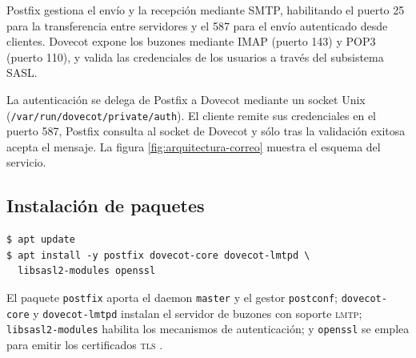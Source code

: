 Postfix gestiona el env\'io y la recepci\'on mediante SMTP, habilitando el
puerto 25 para la transferencia entre servidores y el 587 para el env\'io
autenticado desde clientes. Dovecot expone los buzones mediante IMAP
(puerto 143) y POP3 (puerto 110), y valida las credenciales de los usuarios
a trav\'es del subsistema SASL.

La autenticaci\'on se delega de Postfix a Dovecot mediante un socket Unix
(\texttt{/var/run/dovecot/private/auth}). El cliente remite sus
credenciales en el puerto 587, Postfix consulta al socket de Dovecot y s\'olo
tras la validaci\'on exitosa acepta el mensaje. La figura
\ref{fig:arquitectura-correo} muestra el esquema del servicio.


\subsection{Instalaci\'on de paquetes}

\begin{lstlisting}[style=terminal]
$ apt update
$ apt install -y postfix dovecot-core dovecot-lmtpd \
  libsasl2-modules openssl
\end{lstlisting}

El paquete \texttt{postfix} aporta el daemon \texttt{master} y el gestor
\texttt{postconf}; \texttt{dovecot-core} y \texttt{dovecot-lmtpd} instalan el
servidor de buzones con soporte \textsc{lmtp}; \texttt{libsasl2-modules}
habilita los mecanismos de autenticaci\'on; y \texttt{openssl} se emplea
para emitir los certificados \textsc{tls} \cite{opensslDocs}.

